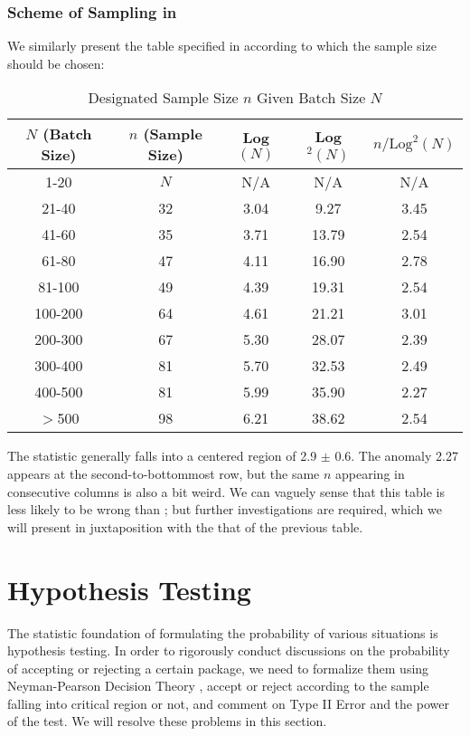 \documentclass[12pt]{article}
\begin{document}
\subsubsection{Scheme of Sampling in \cite{OIML2016}}

We similarly present the table specified in \cite{OIML2016} according to which the sample size should be chosen:

\begin{table}[htbp]
    \centering
    \begin{tabular}{ccccc}
        \toprule
        $N$ (Batch Size) & $n$ (Sample Size) & Log$(N)$ & Log$^2(N)$ & $n/\text{Log}^2(N)$ \\
        \midrule
        1-20 & $N$ & N/A & N/A & N/A \\
        21-40   & 32 & 3.04 & 9.27  & 3.45 \\
        41-60   & 35 & 3.71 & 13.79 & 2.54 \\
        61-80   & 47 & 4.11 & 16.90 & 2.78 \\
        81-100  & 49 & 4.39 & 19.31 & 2.54 \\
        100-200 & 64 & 4.61 & 21.21 & 3.01 \\
        200-300 & 67 & 5.30 & 28.07 & 2.39 \\
        300-400 & 81 & 5.70 & 32.53 & 2.49 \\
        400-500 & 81 & 5.99 & 35.90 & 2.27 \\
        $>$500  & 98 & 6.21 & 38.62 & 2.54 \\
        \bottomrule
    \end{tabular}
    \caption{Designated Sample Size $n$ Given Batch Size $N$}
\end{table}

The statistic generally falls into a centered region of 2.9 $\pm$ 0.6. The anomaly 2.27 appears at the second-to-bottommost row, but the same $n$ appearing in consecutive columns is also a bit weird. We can vaguely sense that this table is less likely to be wrong than \cite{JJF2005}; but further investigations are required, which we will present in juxtaposition with the that of the previous table. 

\section{Hypothesis Testing}

The statistic foundation of formulating the probability of various situations is hypothesis testing. In order to rigorously conduct discussions on the probability of accepting or rejecting a certain package, we need to formalize them using Neyman-Pearson Decision Theory \cite{Ho2023}, accept or reject according to the sample falling into critical region or not, and comment on Type II Error and the power of the test. We will resolve these problems in this section.
\end{document}
